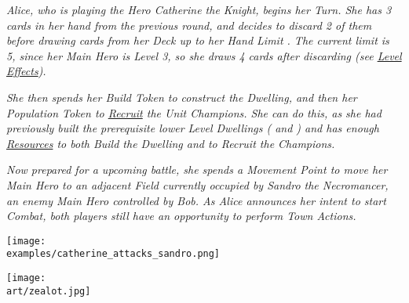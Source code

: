 \begin{multicols}{2}
{  \textit{Alice, who is playing the Hero Catherine the Knight, begins her Turn.
  She has 3 cards in her hand from the previous round, and decides to discard 2 of them before drawing cards from her Deck up to her Hand Limit .
  The current limit is 5, since her Main Hero is Level 3, so she draws 4 cards after discarding (see \hyperlink{Level}{Level Effects}).}\par
  \textit{She then spends her Build Token to construct the  Dwelling, and then her Population Token to \hyperlink{Units}{Recruit} the  Unit Champions.
  She can do this, as she had previously built the prerequisite lower Level Dwellings ( and ) and has enough \hyperlink{Resources}{Resources} to both Build the Dwelling and to Recruit the Champions.}\par
  \textit{Now prepared for a upcoming battle, she spends a Movement Point to move her Main Hero to an adjacent Field currently occupied by Sandro the Necromancer, an enemy Main Hero controlled by Bob.
  As Alice announces her intent to start Combat, both players still have an opportunity to perform Town Actions.}\par
}
\pl{}

\texttt{[image: \\examples/catherine\_attacks\_sandro.png]}

\end{multicols}

\vfill

\begin{scaledfigure}[blanker]
 \centering
 \texttt{[image: \\art/zealot.jpg]}
\end{scaledfigure}
